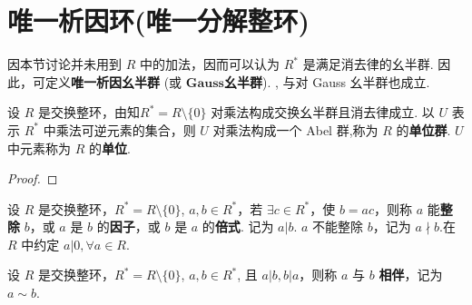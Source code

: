 \documentclass[../../main.tex]{subfiles}%
\begin{document}
\section{唯一析因环(唯一分解整环)}

因本节讨论并未用到 \( R \) 中的加法，因而可以认为 \( R^* \) 是满足消去律的幺半群. 因此，可定义\textbf{唯一析因幺半群} (或 $\mathbf{Gauss}$\textbf{幺半群}). , 与对 Gauss 幺半群也成立.

\begin{theorem}
设 \( R \) 是交换整环，由知\( R^* = R \setminus \{0\} \) 对乘法构成交换幺半群且消去律成立. 以 \( U \) 表示 \( R^* \) 中乘法可逆元素的集合，则 \( U \) 对乘法构成一个 Abel 群,称为 \( R \) 的\textbf{单位群}. \( U \) 中元素称为 \( R \) 的\textbf{单位}.
\end{theorem}
\begin{proof}



\end{proof}

\begin{definition}[整除]
设 \( R \) 是交换整环，\( R^* = R \setminus \{0\} \), \( a, b \in R^* \)，若 \( \exists c \in R^* \)，使 \( b = ac \)，则称 \( a \) 能\textbf{整除} \( b \)，或 \( a \) 是 \( b \) 的\textbf{因子}，或 \( b \) 是 \( a \) 的\textbf{倍式}. 记为 \( a|b \). \( a \) 不能整除 \( b \)，记为 \( a \nmid b \).在 \( R \) 中约定 \( a|0, \forall a \in R \). 
\end{definition}

\begin{definition}[相伴]
设 \( R \) 是交换整环，\( R^* = R \setminus \{0\} \), \( a, b \in R^* \), 且 \( a|b, b|a \)，则称 \( a \) 与 \( b \) \textbf{相伴}，记为 \( a \sim b \).
\end{definition}
\end{document}
